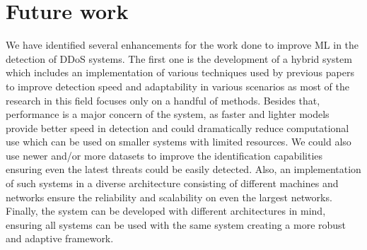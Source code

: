 \documentclass[a4paper, 12pt]{article}
\begin{document}
\section{Future work}

We have identified several enhancements for the work done to improve ML in the detection of DDoS systems. The first one is the development of a hybrid system which includes an implementation of various techniques used by previous papers to improve detection speed and adaptability in various scenarios as most of the research in this field focuses only on a handful of methods. Besides that, performance is a major concern of the system, as faster and lighter models provide better speed in detection and could dramatically reduce computational use which can be used on smaller systems with limited resources. We could also use newer and/or more datasets to improve the identification capabilities ensuring even the latest threats could be easily detected. Also, an implementation of such systems in a diverse architecture consisting of different machines and networks ensure the reliability and scalability on even the largest networks. Finally, the system can be developed with different architectures in mind, ensuring all systems can be used with the same system creating a more robust and adaptive framework. 

\clearpage


{}
\end{document}
